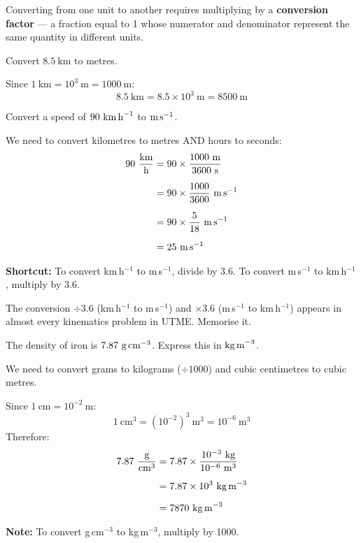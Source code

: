 Converting from one unit to another requires multiplying by
a \textbf{conversion factor} --- a fraction equal to 1 whose
numerator and denominator represent the same quantity in
different units.

\begin{examplebox}[1.1]
Convert $8.5\ \text{km}$ to metres.
\end{examplebox}

\begin{solutionbox}
Since $1\ \text{km} = 10^3\ \text{m} = 1000\ \text{m}$:
\[
  8.5\ \text{km}
  = 8.5 \times 10^3\ \text{m}
  = 8500\ \text{m}
\]
\end{solutionbox}

\begin{examplebox}[1.2]
Convert a speed of $90\ \text{km\,h}^{-1}$ to
$\text{m\,s}^{-1}$.
\end{examplebox}

\begin{solutionbox}
We need to convert kilometres to metres AND hours to seconds:
\begin{align*}
  90\ \frac{\text{km}}{\text{h}}
  &= 90 \times \frac{1000\ \text{m}}{3600\ \text{s}}\\[6pt]
  &= 90 \times \frac{1000}{3600}\ \text{m\,s}^{-1}\\[6pt]
  &= 90 \times \frac{5}{18}\ \text{m\,s}^{-1}\\[6pt]
  &= 25\ \text{m\,s}^{-1}
\end{align*}

\textbf{Shortcut:} To convert km\,h$^{-1}$ to m\,s$^{-1}$,
divide by 3.6. To convert m\,s$^{-1}$ to km\,h$^{-1}$,
multiply by 3.6.
\end{solutionbox}

\begin{examtipbox}
The conversion $\div 3.6$ (km\,h$^{-1}$ to m\,s$^{-1}$) and
$\times 3.6$ (m\,s$^{-1}$ to km\,h$^{-1}$) appears in
almost every kinematics problem in UTME. Memorise it.
\end{examtipbox}

\begin{examplebox}[1.3]
The density of iron is $7.87\ \text{g\,cm}^{-3}$.
Express this in $\text{kg\,m}^{-3}$.
\end{examplebox}

\begin{solutionbox}
We need to convert grams to kilograms ($\div 1000$) and
cubic centimetres to cubic metres.

Since $1\ \text{cm} = 10^{-2}\ \text{m}$:
\[
  1\ \text{cm}^3 = (10^{-2})^3\ \text{m}^3
  = 10^{-6}\ \text{m}^3
\]
Therefore:
\begin{align*}
  7.87\ \frac{\text{g}}{\text{cm}^3}
  &= 7.87 \times \frac{10^{-3}\ \text{kg}}{10^{-6}\ \text{m}^3}\\[6pt]
  &= 7.87 \times 10^{3}\ \text{kg\,m}^{-3}\\[6pt]
  &= 7870\ \text{kg\,m}^{-3}
\end{align*}

\textbf{Note:} To convert g\,cm$^{-3}$ to kg\,m$^{-3}$,
multiply by 1000.
\end{solutionbox}

